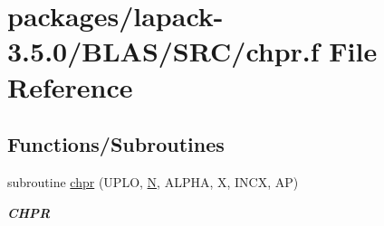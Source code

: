 \hypertarget{lapack-3_85_80_2BLAS_2SRC_2chpr_8f}{}\section{packages/lapack-\/3.5.0/\+B\+L\+A\+S/\+S\+R\+C/chpr.f File Reference}
\label{lapack-3_85_80_2BLAS_2SRC_2chpr_8f}
\subsection*{Functions/\+Subroutines}
\begin{DoxyCompactItemize}
\item 
subroutine \hyperlink{group__complex__blas__level2_gac98100eee08124fb7a5d55effbb85a65}{chpr} (U\+P\+L\+O, \hyperlink{polmisc_8c_a0240ac851181b84ac374872dc5434ee4}{N}, A\+L\+P\+H\+A, X, I\+N\+C\+X, A\+P)
\begin{DoxyCompactList}\small\item\em {\bfseries C\+H\+P\+R} \end{DoxyCompactList}\end{DoxyCompactItemize}
